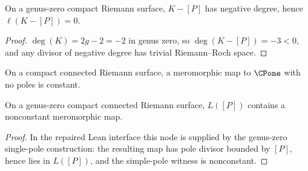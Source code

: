 \begin{lemma}[\(\ell(K-(P))=0\) in genus zero]
\label{lem:genus-zero-rr-vanish-K-minus-point}
On a genus-zero compact Riemann surface, \(K-[P]\) has negative
degree, hence \(\ell(K-[P])=0\).
\leanok
\end{lemma}
\begin{proof}
\leanok
\(\deg(K)=2g-2=-2\) in genus zero, so \(\deg(K-[P])=-3<0\), and any
divisor of negative degree has trivial Riemann--Roch space.
\end{proof}

\begin{lemma}
\label{lem:poles-eq-zero-iff-constant}
On a compact connected Riemann surface, a meromorphic map to \(\CPone\) with no poles is constant.
\leanok
\end{lemma}

\begin{lemma}
\label{lem:rr-space-dim-ge-two-nonconstant}
On a genus-zero compact connected Riemann surface, \(L([P])\) contains a nonconstant
meromorphic map.
\leanok
\end{lemma}
\begin{proof}
\leanok
In the repaired Lean interface this node is supplied by the genus-zero
single-pole construction: the resulting map has pole divisor bounded by
\([P]\), hence lies in \(L([P])\), and the simple-pole witness is
nonconstant.
\end{proof}

